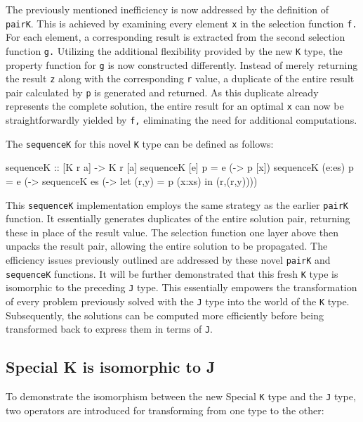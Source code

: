 \documentclass[runningheads]{llncs}
\begin{document}
The previously mentioned inefficiency is now addressed by the definition
of \texttt{pairK}. This is achieved by examining every element
\texttt{x} in the selection function \texttt{f.} For each element, a
corresponding result is extracted from the second selection function
\texttt{g.} Utilizing the additional flexibility provided by the new
\texttt{K} type, the property function for \texttt{g} is now constructed
differently. Instead of merely returning the result \texttt{z} along
with the corresponding \texttt{r} value, a duplicate of the entire
result pair calculated by \texttt{p} is generated and returned. As this
duplicate already represents the complete solution, the entire result
for an optimal \texttt{x} can now be straightforwardly yielded by
\texttt{f,} eliminating the need for additional computations.

The \texttt{sequenceK} for this novel \texttt{K} type can be defined as
follows:

\begin{code}
sequenceK :: [K r a] -> K r [a]
sequenceK [e] p    = e (\x -> p [x])
sequenceK (e:es) p = e (\x -> sequenceK es 
                       (\xs -> let (r,y) = p (x:xs) 
                               in (r,(r,y))))
\end{code}

This \texttt{sequenceK} implementation employs the same strategy as the
earlier \texttt{pairK} function. It essentially generates duplicates of
the entire solution pair, returning these in place of the result value.
The selection function one layer above then unpacks the result pair,
allowing the entire solution to be propagated. The efficiency issues
previously outlined are addressed by these novel \texttt{pairK} and
\texttt{sequenceK} functions. It will be further demonstrated that this
fresh \texttt{K} type is isomorphic to the preceding \texttt{J} type.
This essentially empowers the transformation of every problem previously
solved with the \texttt{J} type into the world of the \texttt{K} type.
Subsequently, the solutions can be computed more efficiently before
being transformed back to express them in terms of \texttt{J}.

\subsection{Special K is isomorphic to
J}\label{special-k-is-isomorphic-to-j}

To demonstrate the isomorphism between the new Special \texttt{K} type
and the \texttt{J} type, two operators are introduced for transforming
from one type to the other:
\end{document}
